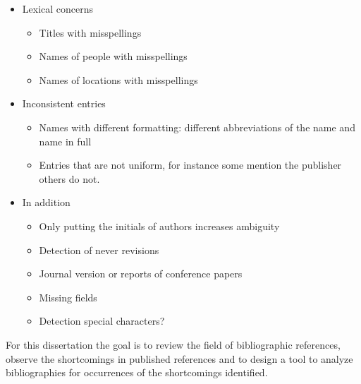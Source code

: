 \begin{itemize}
\item Lexical concerns
  \begin{itemize}
  \item Titles with misspellings
  \item Names of people with misspellings
  \item Names of locations with misspellings
  \end{itemize}
\item Inconsistent entries
  \begin{itemize}
  \item Names with different formatting: different abbreviations of
    the name and name in full
  \item Entries that are not uniform, for instance some mention the
    publisher others do not.
  \end{itemize}
\item In addition
  \begin{itemize}
  \item Only putting the initials of authors increases ambiguity
  \item Detection of never revisions
  \item Journal version or reports of conference papers
  \item Missing fields
  \item Detection special characters?
  \end{itemize}
\end{itemize}

For this dissertation the goal is to review the field of bibliographic
references, observe the shortcomings in published references and to
design a tool to analyze bibliographies for occurrences of the
shortcomings identified.



